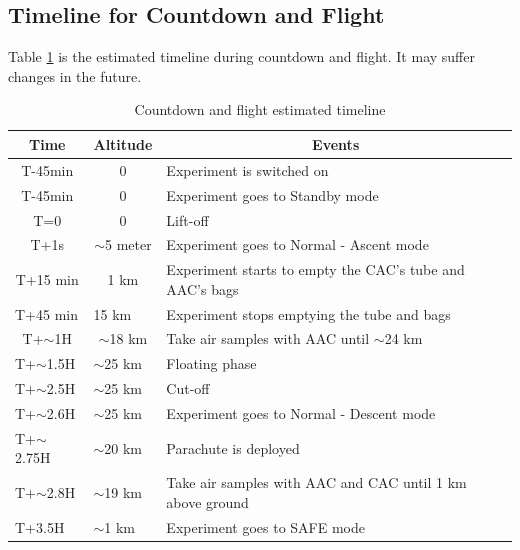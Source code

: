 \documentclass[a4paper,12pt,twoside]{article}
\begin{document}
\subsection{Timeline for Countdown and Flight}
Table \ref{tab:countflight} is the estimated timeline during countdown and flight. It may suffer changes in the future.
\begin{table}[H]
\centering


\begin{tabular}{|l|l|l|}
\hline
\multicolumn{1}{|c|}{\textbf{Time}}       & \multicolumn{1}{c|}{\textbf{Altitude}}      & \multicolumn{1}{c|}{\textbf{Events}}                              \\ \hline
\multicolumn{1}{|c|}{T-45min}    & \multicolumn{1}{c|}{0}             & Experiment is switched on                                \\ \hline
\multicolumn{1}{|c|}{T-45min}    & \multicolumn{1}{c|}{0}             & Experiment goes to Standby mode                          \\ \hline
\multicolumn{1}{|c|}{T=0}        & \multicolumn{1}{c|}{0}             & Lift-off                                                 \\ \hline
\multicolumn{1}{|c|}{T+1s}       & \multicolumn{1}{c|}{$\sim$5 meter} & Experiment goes to Normal - Ascent mode                  \\ \hline
\multicolumn{1}{|c|}{T+15 min}   & \multicolumn{1}{c|}{1 km}          & Experiment starts to empty the CAC's tube and AAC's bags \\ \hline
T+45 min                         & 15 km                              & Experiment stops emptying the tube and bags              \\ \hline
\multicolumn{1}{|c|}{T+$\sim$1H} & \multicolumn{1}{c|}{$\sim$18 km}   & Take air samples with AAC until $\sim$24 km                       \\ \hline
T+$\sim$1.5H                     & $\sim$25 km                        & Floating phase                                           \\ \hline
T+$\sim$2.5H                     & $\sim$25 km                        & Cut-off                                                  \\ \hline
T+$\sim$2.6H                     & $\sim$25 km                        & Experiment goes to Normal - Descent mode                 \\ \hline
T+$\sim$2.75H                    & $\sim$20 km                        & Parachute is deployed                                    \\ \hline
T+$\sim$2.8H                     & $\sim$19 km                        & Take air samples with AAC and CAC until 1 km above ground                 \\ \hline
T+3.5H                           & $\sim$1 km                         & Experiment goes to SAFE mode                             \\ \hline
\end{tabular}
\caption{Countdown and flight estimated timeline}
\label{tab:countflight}
\end{table}
\raggedbottom
\pagebreak
\end{document}
